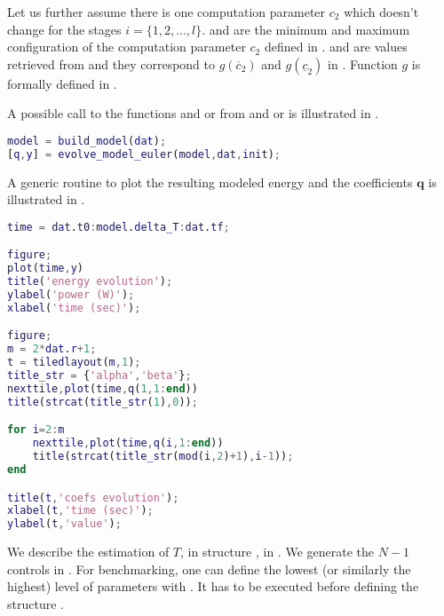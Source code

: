Let us further assume there is one computation parameter $c_2$ which doesn't change for the stages $i=\{1,2,\dots,l\}$.  and  are the minimum and maximum configuration of the computation parameter $c_2$ defined in .  and  are values retrieved from \powprof{} and they correspond to $g(\overline{c}_2)$ and $g(\underline{c}_2)$ in . Function $g$ is formally defined in .

A possible call to the functions  and  or  from  and  or  is illustrated in .

\begin{lstlisting}[language=Matlab,caption={[Example to build and evolve the model]An example to build a differential model and evolve it over a horizon $N$.},captionpos=b,label=lst:call_model]
model = build_model(dat);
[q,y] = evolve_model_euler(model,dat,init);
\end{lstlisting}

A generic routine to plot the resulting modeled energy and the coefficients $\mathbf{q}$ is illustrated in .

\begin{lstlisting}[language=Matlab,caption={[Plot of the modeled energy and coefficients]A generic polotting routine for them modeled energy and coefficients evolution.},captionpos=b,label=lst:model_plot]
time = dat.t0:model.delta_T:dat.tf;

figure;
plot(time,y)
title('energy evolution');
ylabel('power (W)');
xlabel('time (sec)');

figure;
m = 2*dat.r+1;
t = tiledlayout(m,1);
title_str = {'alpha','beta'};
nexttile,plot(time,q(1,1:end))
title(strcat(title_str(1),0));

for i=2:m
    nexttile,plot(time,q(i,1:end))
    title(strcat(title_str(mod(i,2)+1),i-1));
end

title(t,'coefs evolution');
xlabel(t,'time (sec)');
ylabel(t,'value');
\end{lstlisting}

We describe the estimation of $T$,  in structure , in . We generate the $N-1$ controls in . For benchmarking, one can define the lowest (or similarly the highest) level of parameters with . It has to be executed before defining the structure .

